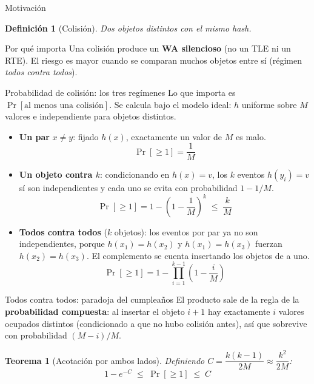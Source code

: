\documentclass{beamer}
\newtheorem{definicion}{Definición}
\newtheorem{teorema}{Teorema}
\begin{document}
\begin{frame}{Motivación}
\begin{definicion}[Colisión]
Dos objetos distintos con el mismo hash.
\end{definicion}
\begin{block}{Por qué importa}
Una colisión produce un \textbf{WA silencioso} (no un TLE ni un RTE). El riesgo es mayor cuando se comparan muchos objetos entre sí (régimen \emph{todos contra todos}).
\end{block}
\end{frame}

\begin{frame}{Probabilidad de colisión: los tres regímenes}
\footnotesize
Lo que importa es $\Pr[\text{al menos una colisión}]$. Se calcula bajo el modelo ideal: $h$ uniforme sobre $M$ valores e independiente para objetos distintos.
\begin{itemize}
    \item \textbf{Un par} $x \neq y$: fijado $h(x)$, exactamente un valor de $M$ es malo.
    \[ \Pr[\ge 1] = \frac{1}{M} \]
    \pause
    \item \textbf{Un objeto contra $k$}: condicionando en $h(x) = v$, los $k$ eventos $h(y_i) = v$ sí son independientes y cada uno se evita con probabilidad $1 - 1/M$.
    \[ \Pr[\ge 1] = 1 - \left(1-\frac{1}{M}\right)^{k} \;\le\; \frac{k}{M} \]
    \pause
    \item \textbf{Todos contra todos} ($k$ objetos): los eventos por par ya no son independientes, porque $h(x_1) = h(x_2)$ y $h(x_1) = h(x_3)$ fuerzan $h(x_2) = h(x_3)$. El complemento se cuenta insertando los objetos de a uno.
    \[ \Pr[\ge 1] = 1 - \prod_{i=1}^{k-1}\left(1 - \frac{i}{M}\right) \]
\end{itemize}
\end{frame}

\begin{frame}{Todos contra todos: paradoja del cumpleaños}
El producto sale de la regla de la \textbf{probabilidad compuesta}: al insertar el objeto $i+1$ hay exactamente $i$ valores ocupados distintos (condicionado a que no hubo colisión antes), así que sobrevive con probabilidad $(M-i)/M$.
\pause
\begin{teorema}[Acotación por ambos lados]
Definiendo $C = \dfrac{k(k-1)}{2M} \approx \dfrac{k^2}{2M}$:
\[ 1 - e^{-C} \;\le\; \Pr[\ge 1] \;\le\; C \]
\end{teorema}
\end{frame}
\end{document}
